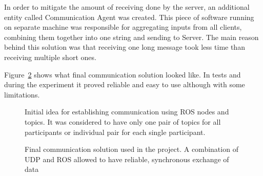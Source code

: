 \documentclass[11pt,english]{article}
\begin{document}
\par
In order to mitigate the amount of receiving done by the server, an additional entity called Communication Agent was created. This piece of software running on separate machine was responsible for aggregating inputs from all clients, combining them together into one string and sending to Server. The main reason behind this solution was that receiving one long message took less time than receiving multiple short ones. 
\par
Figure~\ref{fig:ros_final} shows what final communication solution looked like. In tests and during the experiment it proved reliable and easy to use although with some limitations.

\begin{figure}[!] 
\caption{Initial idea for establishing communication using ROS nodes and topics. It was considered to have only one pair of topics for all participants or individual pair for each single participant.}
\label{fig:ros_initial_idea}
\end{figure} 


\begin{figure}[!] 
\caption{Final communication solution used in the project. A combination of UDP and ROS allowed to have reliable, synchronous exchange of data}
\label{fig:ros_final}
\end{figure} 
\end{document}
